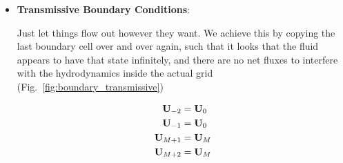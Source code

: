 \begin{itemize}
\item \textbf{Transmissive Boundary Conditions}:

Just let things flow out however they want. We achieve this by copying the last
boundary cell over and over again, such that it looks that the fluid appears to
have that state infinitely, and there are no net fluxes to interfere with the
hydrodynamics inside the actual grid (Fig.~\ref{fig:boundary_transmissive})

\begin{align*}
	\mathbf{U}_{-2} &= \mathbf{U}_0		\\
	\mathbf{U}_{-1} &= \mathbf{U}_0		\\
	\mathbf{U}_{M+1} &= \mathbf{U}_{M}	\\
	\mathbf{U}_{M+2} &= \mathbf{U}_{M}	\\
\end{align*}

\end{itemize}


